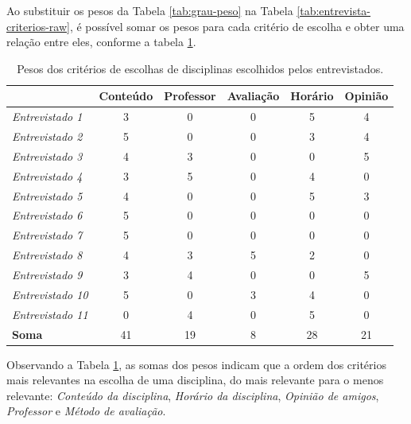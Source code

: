 Ao substituir os pesos da Tabela \ref{tab:grau-peso} na Tabela \ref{tab:entrevista-criterios-raw}, é possível somar os pesos para cada critério de escolha e obter uma relação entre eles, conforme a tabela \ref{tab:entrevista-criterios-peso}.

\begin{table}[!ht]
    \begin{center}
        \begin{tabular}{ l||c|c|c|c|c| } 
            & Conteúdo & Professor & Avaliação & Horário & Opinião \\ 
            \hline 
            \textit{Entrevistado 1 } & 3 & 0 & 0 & 5 & 4 \\     %
            \textit{Entrevistado 2 } & 5 & 0 & 0 & 3 & 4 \\     %
            \textit{Entrevistado 3 } & 4 & 3 & 0 & 0 & 5 \\     %
            \textit{Entrevistado 4 } & 3 & 5 & 0 & 4 & 0 \\     %
            \textit{Entrevistado 5 } & 4 & 0 & 0 & 5 & 3 \\     %
            \textit{Entrevistado 6 } & 5 & 0 & 0 & 0 & 0 \\     %
            \textit{Entrevistado 7 } & 5 & 0 & 0 & 0 & 0 \\     %
            \textit{Entrevistado 8 } & 4 & 3 & 5 & 2 & 0 \\     %
            \textit{Entrevistado 9 } & 3 & 4 & 0 & 0 & 5 \\     %
            \textit{Entrevistado 10} & 5 & 0 & 3 & 4 & 0 \\     %
            \textit{Entrevistado 11} & 0 & 4 & 0 & 5 & 0 \\     %
            \hline
            \textbf{Soma}            & 41& 19& 8 & 28& 21 
        \end{tabular}
    \end{center}
    \caption{Pesos dos critérios de escolhas de disciplinas escolhidos pelos entrevistados.}
    \label{tab:entrevista-criterios-peso}
\end{table}

Observando a Tabela \ref{tab:entrevista-criterios-peso}, as somas dos pesos indicam que a ordem dos critérios mais relevantes na escolha de uma disciplina, do mais relevante para o menos relevante:
\textit{Conteúdo da disciplina}, \textit{Horário da disciplina}, \textit{Opinião de amigos}, \textit{Professor} e \textit{Método de avaliação}.

